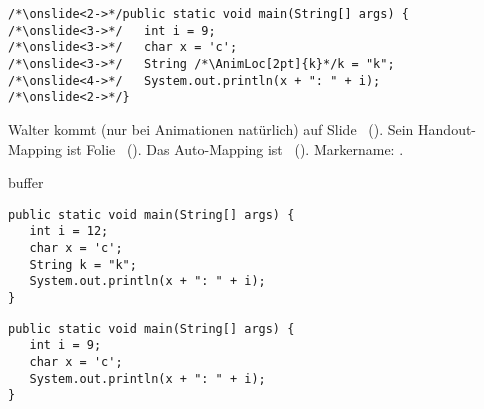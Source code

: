 \documentclass{beamer}
\begin{document}
\begin{frame}[fragile]
\begin{verbatim}
/*\onslide<2->*/public static void main(String[] args) {
/*\onslide<3->*/   int i = 9;
/*\onslide<3->*/   char x = 'c';
/*\onslide<3->*/   String /*\AnimLoc[2pt]{k}*/k = "k";
/*\onslide<4->*/   System.out.println(x + ": " + i);
/*\onslide<2->*/}
\end{verbatim}
\endAnimateCode
Walter kommt (nur bei Animationen natürlich) auf Slide \WalterAnim~(). Sein Handout-Mapping ist Folie \WalterHandout~(). Das Auto-Mapping ist \Walter~(). Markername: . %
\end{frame}

\begin{frame}
   buffer
\end{frame}

\begin{frame}[fragile]
\begin{verbatim}
public static void main(String[] args) {
   int i = 12;
   char x = 'c';
   String k = "k";
   System.out.println(x + ": " + i);
}
\end{verbatim}
\endAnimateCode
\end{frame}

\begin{frame}[fragile]
\begin{verbatim}
public static void main(String[] args) {
   int i = 9;
   char x = 'c';
   System.out.println(x + ": " + i);
}
\end{verbatim}
\end{frame}
\end{document}
